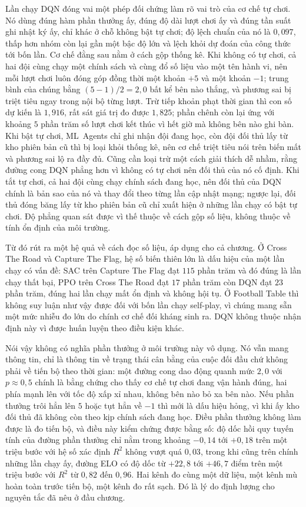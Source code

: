 \indent Lần chạy DQN đóng vai một phép đối chứng làm rõ vai trò của cơ chế tự chơi. Nó dùng
đúng hàm phần thưởng ấy, đúng độ dài lượt chơi ấy và đúng tần suất ghi nhật ký ấy, chỉ khác ở
chỗ không bật tự chơi; độ lệch chuẩn của nó là $0{,}097$, thấp hơn nhóm còn lại gần một bậc
độ lớn và lệch khỏi dự đoán của công thức tới bốn lần. Cơ chế đằng sau nằm ở cách gộp thống
kê. Khi không có tự chơi, cả hai đội cùng chạy một chính sách và cùng đổ số liệu vào một tên
hành vi, nên mỗi lượt chơi luôn đóng góp đồng thời một khoản $+5$ và một khoản $-1$; trung
bình của chúng bằng $(5-1)/2 = 2{,}0$ bất kể bên nào thắng, và phương sai bị triệt tiêu ngay
trong nội bộ từng lượt. Trừ tiếp khoản phạt thời gian thì con số dự kiến là $1{,}916$, rất
sát giá trị đo được $1{,}825$; phần chênh còn lại ứng với khoảng $5$ phần trăm số lượt chơi
kết thúc vì hết giờ mà không bên nào ghi bàn. Khi bật tự chơi, ML~Agents chỉ ghi nhận đội
đang học, còn đội đối thủ lấy từ kho phiên bản cũ thì bị loại khỏi thống kê, nên cơ chế triệt
tiêu nói trên biến mất và phương sai lộ ra đầy đủ. Cũng cần loại trừ một cách giải thích dễ
nhầm, rằng đường cong DQN phẳng hơn vì không có tự chơi nên đối thủ của nó cố định. Khi tắt
tự chơi, cả hai đội cùng chạy chính sách đang học, nên đối thủ của DQN chính là bản sao của
nó và thay đổi theo từng lần cập nhật mạng; ngược lại, đối thủ đóng băng lấy từ kho phiên bản
cũ chỉ xuất hiện ở những lần chạy có bật tự chơi. Độ phẳng quan sát được vì thế thuộc về cách
gộp số liệu, không thuộc về tính ổn định của môi trường.

\indent Từ đó rút ra một hệ quả về cách đọc số liệu, áp dụng cho cả chương. Ở Cross The Road
và Capture The Flag, hệ số biến thiên lớn là dấu hiệu của một lần chạy có vấn đề: SAC trên
Capture The Flag đạt $115$ phần trăm và đó đúng là lần chạy thất bại, PPO trên Cross The Road
đạt $17$ phần trăm còn DQN đạt $23$ phần trăm, đúng hai lần chạy mất ổn định và không hội tụ.
Ở Football Table thì không suy luận như vậy được đối với bốn lần chạy self-play, vì chúng
mang sẵn một mức nhiễu đo lớn do chính cơ chế đối kháng sinh ra. DQN không thuộc nhận định
này vì được huấn luyện theo điều kiện khác.

\indent Nói vậy không có nghĩa phần thưởng ở môi trường này vô dụng. Nó vẫn mang thông tin,
chỉ là thông tin về trạng thái cân bằng của cuộc đối đầu chứ không phải về tiến bộ theo thời
gian: một đường cong dao động quanh mức $2{,}0$ với $p \approx 0{,}5$ chính là bằng chứng cho
thấy cơ chế tự chơi đang vận hành đúng, hai phía mạnh lên với tốc độ xấp xỉ nhau, không bên
nào bỏ xa bên nào. Nếu phần thưởng trôi hẳn lên $5$ hoặc tụt hẳn về $-1$ thì mới là dấu hiệu
hỏng, vì khi ấy kho đối thủ đã không còn theo kịp chính sách đang học. Điều phần thưởng không
làm được là đo tiến bộ, và điều này kiểm chứng được bằng số: độ dốc hồi quy tuyến tính của
đường phần thưởng chỉ nằm trong khoảng $-0{,}14$ tới $+0{,}18$ trên một triệu bước với hệ số
xác định $R^{2}$ không vượt quá $0{,}03$, trong khi cũng trên chính những lần chạy ấy, đường
ELO có độ dốc từ $+22{,}8$ tới $+46{,}7$ điểm trên một triệu bước với $R^{2}$ từ $0{,}82$ đến
$0{,}96$. Hai kênh đo cùng một dữ liệu, một kênh mù hoàn toàn trước tiến bộ, một kênh đo rất
sạch. Đó là lý do định lượng cho nguyên tắc đã nêu ở đầu chương.

